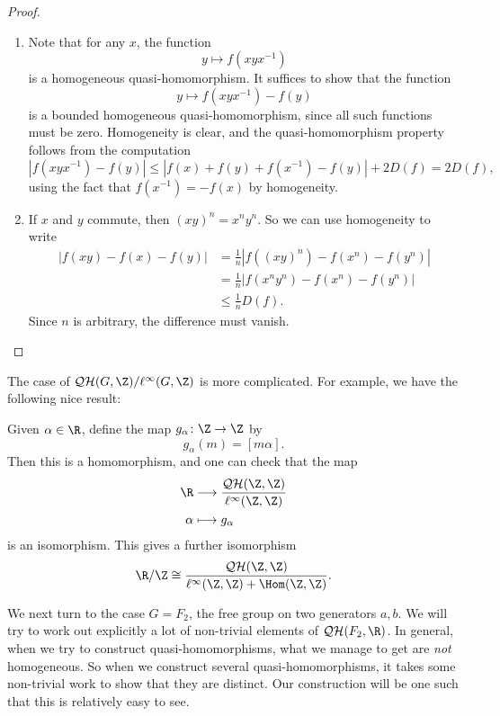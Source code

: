 \documentclass[a4paper]{article}
\newcommand\QH{\mathcal{QH}}
\newcommand\Free{F}
\begin{document}
\begin{proof}\leavevmode
  \begin{enumerate}
    \item Note that for any $x$, the function
      \[
        y \mapsto f(xyx^{-1})
      \]
      is a homogeneous quasi-homomorphism. It suffices to show that the function
      \[
        y \mapsto f(xyx^{-1}) - f(y)
      \]
      is a bounded homogeneous quasi-homomorphism, since all such functions must be zero. Homogeneity is clear, and the quasi-homomorphism property follows from the computation
      \[
        |f(xyx^{-1}) - f(y)| \leq |f(x) + f(y) + f(x^{-1}) - f(y)| + 2D(f) = 2D(f),
      \]
      using the fact that $f(x^{-1}) = -f(x)$ by homogeneity.
    \item If $x$ and $y$ commute, then $(xy)^n = x^n y^n$. So we can use homogeneity to write
      \begin{align*}
        |f(xy) - f(x) - f(y)| &= \frac{1}{n} |f((xy)^n) - f(x^n) - f(y^n)|\\
        &= \frac{1}{n} | f(x^n y^n) - f(x^n) - f(y^n)|\\
        &\leq \frac{1}{n} D(f).
      \end{align*}
      Since $n$ is arbitrary, the difference must vanish.\qedhere
  \end{enumerate}
\end{proof}

The case of $\QH(G, \Z)/\ell^\infty(G, \Z)$ is more complicated. For example, we have the following nice result:
\begin{eg}
  Given $\alpha \in \R$, define the map $g_\alpha\colon \Z \to \Z$ by
  \[
    g_\alpha(m) = [m\alpha].
  \]
  Then this is a homomorphism, and one can check that the map
  \begin{align*}
    \R &\longrightarrow \frac{\QH(\Z, \Z)}{\ell^\infty(\Z, \Z)}\\
    \alpha &\longmapsto g_\alpha
  \end{align*}
  is an isomorphism. This gives a further isomorphism
  \[
    \R/\Z \cong \frac{\QH(\Z, \Z)}{\ell^\infty(\Z, \Z) + \Hom(\Z, \Z)}.
  \]
\end{eg}

We next turn to the case $G = \Free_2$, the free group on two generators $a, b$. We will try to work out explicitly a lot of non-trivial elements of $\QH(\Free_2, \R)$. In general, when we try to construct quasi-homomorphisms, what we manage to get are \emph{not} homogeneous. So when we construct several quasi-homomorphisms, it takes some non-trivial work to show that they are distinct. Our construction will be one such that this is relatively easy to see.
\end{document}
